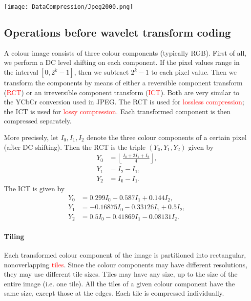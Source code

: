 \documentclass[a4paper, 11pt, openany]{book}
\numberwithin{equation}{section}
\theoremstyle{plain}
\theoremstyle{definition}
\newcommand{\Important}[1]{\textcolor{red}{#1}}
\begin{document}
\begin{center}
    \texttt{[image: DataCompression/Jpeg2000.png]}
\end{center}



\subsection{Operations before wavelet transform coding}


A colour image consists of three colour components (typically RGB). First of all, we perform a DC level shifting on each component. If the pixel values range in the interval $[0, 2^k - 1]$, then we subtract $2^k - 1$ to each pixel value. Then we transform the components by means of either a reversible component transform (\Important{RCT}) or an irreversible component transform (\Important{ICT}). Both are very similar to the YCbCr conversion used in JPEG. The RCT is used for \Important{lossless compression}; the ICT is used for \Important{lossy compression}. Each transformed component is then compressed separately.

More precisely, let $I_0, I_1, I_2$ denote the three colour components of a certain pixel (after DC shifting). Then the RCT is the triple $(Y_0, Y_1, Y_2)$ given by
\begin{align*}
    Y_0 &= \left\lfloor \frac{I_0 + 2 I_1 + I_2}{4} \right\rfloor,\\
    Y_1 &= I_2 - I_1,\\
    Y_2 &= I_0 - I_1.
\end{align*}
The ICT is given by
\begin{align*}
    Y_0 &= 0.299 I_0 + 0.587 I_1 + 0.144 I_2,\\
    Y_1 &= -0.16875 I_0 - 0.33126 I_1 + 0.5 I_2,\\
    Y_2 &= 0.5 I_0 - 0.41869 I_1 - 0.08131 I_2.
\end{align*}

\paragraph{Tiling}
Each transformed colour component of the image is partitioned into rectangular, nonoverlapping \Important{tiles}. Since the colour components may have different resolutions, they may use different tile sizes. Tiles may have any size, up to the size of the entire image (i.e. one tile). All the tiles of a given colour component have the same size, except those at the edges. Each tile is compressed individually.
\end{document}
